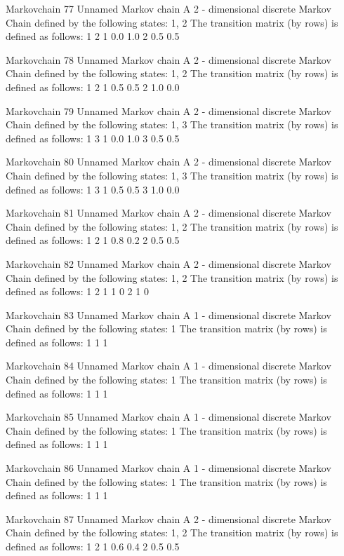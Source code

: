 \documentclass[
  nojss]{jss}
\begin{document}
\begin{CodeChunk}
\begin{CodeOutput}
Markovchain  77 
Unnamed Markov chain 
 A  2 - dimensional discrete Markov Chain defined by the following states: 
 1, 2 
 The transition matrix  (by rows)  is defined as follows: 
    1   2
1 0.0 1.0
2 0.5 0.5

Markovchain  78 
Unnamed Markov chain 
 A  2 - dimensional discrete Markov Chain defined by the following states: 
 1, 2 
 The transition matrix  (by rows)  is defined as follows: 
    1   2
1 0.5 0.5
2 1.0 0.0

Markovchain  79 
Unnamed Markov chain 
 A  2 - dimensional discrete Markov Chain defined by the following states: 
 1, 3 
 The transition matrix  (by rows)  is defined as follows: 
    1   3
1 0.0 1.0
3 0.5 0.5

Markovchain  80 
Unnamed Markov chain 
 A  2 - dimensional discrete Markov Chain defined by the following states: 
 1, 3 
 The transition matrix  (by rows)  is defined as follows: 
    1   3
1 0.5 0.5
3 1.0 0.0

Markovchain  81 
Unnamed Markov chain 
 A  2 - dimensional discrete Markov Chain defined by the following states: 
 1, 2 
 The transition matrix  (by rows)  is defined as follows: 
    1   2
1 0.8 0.2
2 0.5 0.5

Markovchain  82 
Unnamed Markov chain 
 A  2 - dimensional discrete Markov Chain defined by the following states: 
 1, 2 
 The transition matrix  (by rows)  is defined as follows: 
  1 2
1 1 0
2 1 0

Markovchain  83 
Unnamed Markov chain 
 A  1 - dimensional discrete Markov Chain defined by the following states: 
 1 
 The transition matrix  (by rows)  is defined as follows: 
  1
1 1

Markovchain  84 
Unnamed Markov chain 
 A  1 - dimensional discrete Markov Chain defined by the following states: 
 1 
 The transition matrix  (by rows)  is defined as follows: 
  1
1 1

Markovchain  85 
Unnamed Markov chain 
 A  1 - dimensional discrete Markov Chain defined by the following states: 
 1 
 The transition matrix  (by rows)  is defined as follows: 
  1
1 1

Markovchain  86 
Unnamed Markov chain 
 A  1 - dimensional discrete Markov Chain defined by the following states: 
 1 
 The transition matrix  (by rows)  is defined as follows: 
  1
1 1

Markovchain  87 
Unnamed Markov chain 
 A  2 - dimensional discrete Markov Chain defined by the following states: 
 1, 2 
 The transition matrix  (by rows)  is defined as follows: 
    1   2
1 0.6 0.4
2 0.5 0.5


\end{CodeOutput}
\end{CodeChunk}
\end{document}
